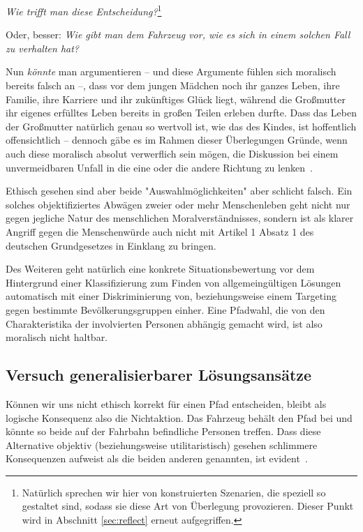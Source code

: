 \documentclass[twocolumn, german]{tum-article}
\begin{document}
\emph{Wie trifft man diese Entscheidung?}\footnote{Natürlich sprechen wir hier von konstruierten Szenarien, die speziell so gestaltet sind, sodass sie diese Art von Überlegung provozieren. Dieser Punkt wird in Abschnitt \vref{sec:reflect} erneut aufgegriffen.\label{fn:constructed}}

Oder, besser: \emph{Wie gibt man dem Fahrzeug vor, wie es sich in einem solchen Fall zu verhalten hat?}

Nun \emph{könnte} man argumentieren -- und diese Argumente fühlen sich moralisch bereits falsch an --, dass vor dem jungen Mädchen noch ihr ganzes Leben, ihre Familie, ihre Karriere und ihr zukünftiges Glück liegt, während die Großmutter ihr eigenes erfülltes Leben bereits in großen Teilen erleben durfte.
Dass das Leben der Großmutter natürlich genau so wertvoll ist, wie das des Kindes, ist hoffentlich offensichtlich -- dennoch gäbe es im Rahmen dieser Überlegungen Gründe, wenn auch diese moralisch absolut verwerflich sein mögen, die Diskussion bei einem unvermeidbaren Unfall in die eine oder die andere Richtung zu lenken~\cite[S. 69f.]{maurer-autonomous}.

Ethisch gesehen sind aber beide "Auswahlmöglichkeiten" aber schlicht falsch.
Ein solches objektifiziertes Abwägen zweier oder mehr Menschenleben geht nicht nur gegen jegliche Natur des menschlichen Moralverständnisses, sondern ist als klarer Angriff gegen die Menschenwürde auch nicht mit Artikel 1 Absatz 1 des deutschen Grundgesetzes in Einklang zu bringen.

Des Weiteren geht natürlich eine konkrete Situationsbewertung vor dem Hintergrund einer Klassifizierung zum Finden von allgemeingültigen Lösungen automatisch mit einer Diskriminierung von, beziehungsweise einem Targeting gegen bestimmte Bevölkerungsgruppen einher.
Eine Pfadwahl, die von den Charakteristika der involvierten Personen abhängig gemacht wird, ist also moralisch nicht haltbar.


\subsection{Versuch generalisierbarer Lösungsansätze}
Können wir uns nicht ethisch korrekt für einen Pfad entscheiden, bleibt als logische Konsequenz also die Nichtaktion.
Das Fahrzeug behält den Pfad bei und könnte so beide auf der Fahrbahn befindliche Personen treffen.
Dass diese Alternative objektiv (beziehungsweise utilitaristisch) gesehen schlimmere Konsequenzen aufweist als die beiden anderen genannten, ist evident~\cite[S. 70]{maurer-autonomous}.
\end{document}

